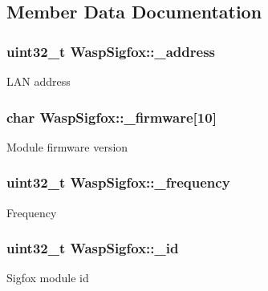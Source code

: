 \subsection{Member Data Documentation}
\subsubsection[{\texorpdfstring{\+\_\+address}{_address}}]{\setlength{\rightskip}{0pt plus 5cm}uint32\+\_\+t Wasp\+Sigfox\+::\+\_\+address}\hypertarget{class_wasp_sigfox_a862a3f4d31688e55b8ae4abedad73ff6}{}\label{class_wasp_sigfox_a862a3f4d31688e55b8ae4abedad73ff6}
L\+AN address 
\subsubsection[{\texorpdfstring{\+\_\+firmware}{_firmware}}]{\setlength{\rightskip}{0pt plus 5cm}char Wasp\+Sigfox\+::\+\_\+firmware\mbox{[}10\mbox{]}}\hypertarget{class_wasp_sigfox_a0c12325b55f9576f7e6b8bda25064eaa}{}\label{class_wasp_sigfox_a0c12325b55f9576f7e6b8bda25064eaa}
Module firmware version 
\subsubsection[{\texorpdfstring{\+\_\+frequency}{_frequency}}]{\setlength{\rightskip}{0pt plus 5cm}uint32\+\_\+t Wasp\+Sigfox\+::\+\_\+frequency}\hypertarget{class_wasp_sigfox_a7e22c7c2a41f2f0363db5cdb330c1afd}{}\label{class_wasp_sigfox_a7e22c7c2a41f2f0363db5cdb330c1afd}
Frequency 
\subsubsection[{\texorpdfstring{\+\_\+id}{_id}}]{\setlength{\rightskip}{0pt plus 5cm}uint32\+\_\+t Wasp\+Sigfox\+::\+\_\+id}\hypertarget{class_wasp_sigfox_af85ecdd24a98829e0e0ebec50ff0363c}{}\label{class_wasp_sigfox_af85ecdd24a98829e0e0ebec50ff0363c}
Sigfox module id 
